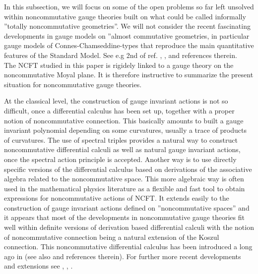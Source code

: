 \documentclass[a4paper,11pt,twoside]{article}
\numberwithin{equation}{section}
\theoremstyle{nonumberplain}
\begin{document}
In this subsection, we will focus on some of the open problems so far left unsolved within noncommutative gauge theories built on what could be called informally  ''totally noncommutative geometries''. We will not consider the recent fascinating developments in gauge models on ''almost commutative geometries, in particular gauge models of Connes-Chamseddine-types that reproduce the main quantitative features of the Standard Model. See e.g 2nd of ref. \cite{Connes1}, \cite{ccs1}, \cite{ccs2}and references therein. \\
The NCFT studied in this paper is rigidely linked to a gauge theory on the noncommutative Moyal plane. It is therefore instructive to summarize the present situation for noncommutative gauge theories.\par
At the classical level, the construction of gauge invariant actions is not so difficult, once a differential calculus has been set up, together with a proper notion of noncommutative connection. This basically amounts to built a gauge invariant polynomial depending on some curvatures, usually a trace of products of curvatures. The use of spectral triples provides a natural way to construct noncommutative differential calculi as well as natural gauge invariant actions, once the spectral action principle is accepted. Another way is to use directly specific versions of the differential calculus based on derivations of the associative algebra related to the noncommutative space. This more algebraic way is often used in the mathematical physics literature as a flexible and fast tool to obtain expressions for noncommutative actions of NCFT. It extends easily to the construction of gauge invariant actions defined on ''noncommutative spaces'' and it appears that most of the developments in noncommutative gauge 
theories fit well within definite versions of derivation based differential calculi with the notion of noncommutative connection being a natural extension of the Koszul connection. This noncommutative differential calculus has been introduced a long ago in \cite{mdv88} (see also \cite{mdv99} and references therein). For further more recent developments and extensions see \cite{WAL1}, \cite{WAL2}, \cite{WAL3}.\par
\end{document}
